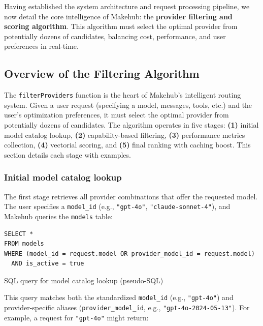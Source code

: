 \documentclass[english]{article}
\begin{document}
Having established the system architecture and request processing pipeline, we now detail the core intelligence of Makehub: the \textbf{provider filtering and scoring algorithm}. This algorithm must select the optimal provider from potentially dozens of candidates, balancing cost, performance, and user preferences in real-time.

\subsection{Overview of the Filtering Algorithm}

The \texttt{filterProviders} function is the heart of Makehub's intelligent routing system. Given a user request (specifying a model, messages, tools, etc.) and the user's optimization preferences, it must select the optimal provider from potentially dozens of candidates. The algorithm operates in five stages: \textbf{(1)} initial model catalog lookup, \textbf{(2)} capability-based filtering, \textbf{(3)} performance metrics collection, \textbf{(4)} vectorial scoring, and \textbf{(5)} final ranking with caching boost. This section details each stage with examples.

\subsubsection{Initial model catalog lookup}

The first stage retrieves all provider combinations that offer the requested model. The user specifies a \texttt{model\_id} (e.g., \texttt{"gpt-4o"}, \texttt{"claude-sonnet-4"}), and Makehub queries the \texttt{models} table:

\begin{listing}[H]
\begin{verbatim}
SELECT *
FROM models
WHERE (model_id = request.model OR provider_model_id = request.model)
  AND is_active = true
\end{verbatim}
\caption{SQL query for model catalog lookup (pseudo-SQL)}
\end{listing}

This query matches both the standardized \texttt{model\_id} (e.g., \texttt{"gpt-4o"}) and provider-specific aliases (\texttt{provider\_model\_id}, e.g., \texttt{"gpt-4o-2024-05-13"}). For example, a request for \texttt{"gpt-4o"} might return:
\end{document}

